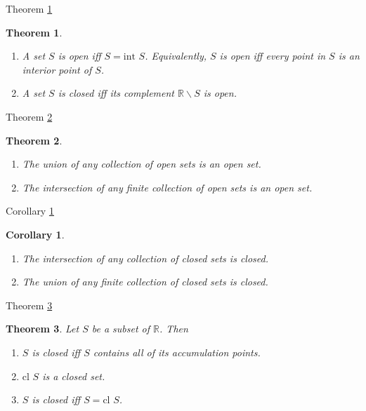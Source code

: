 \documentclass[avery5371,grid]{flashcards}
\newtheorem{corollary}{Corollary}
\newtheorem{theorem}{Theorem}
\newcommand{\bb}[1]{\mathbb{#1}}
\newcommand{\R}{\bb{R}}
\newcommand{\cl}{\mbox{cl }}
\newcommand{\interior}{\mbox{int }}
\begin{document}
\begin{flashcard}[Theorem]{Theorem \ref{thm41}}
\begin{theorem}
\label{thm41} \quad \\
\begin{enumerate}
\item A set $S$ is open iff $S = \interior S$.  Equivalently, $S$ is
open iff every point in $S$ is an interior point of $S$.
\item A set $S$ is closed iff its complement $\R \smallsetminus S$ is
open.
\end{enumerate}
\end{theorem}
\end{flashcard}

\begin{flashcard}[Theorem]{Theorem \ref{thm42}}
\begin{theorem}
\label{thm42} \quad \\
\begin{enumerate}
\item The union of any collection of open sets is an open set.
\item The intersection of any finite collection of open sets is an open
set.
\end{enumerate}
\end{theorem}
\end{flashcard}

\begin{flashcard}[Corollary]{Corollary \ref{cor01}}
\begin{corollary}
\label{cor01} \quad \\
\begin{enumerate}
\item The intersection of any collection of closed sets is closed.
\item The union of any finite collection of closed sets is closed.
\end{enumerate}
\end{corollary}
\end{flashcard}

\begin{flashcard}[Theorem]{Theorem \ref{thm43}}
\begin{theorem}
\label{thm43}
Let $S$ be a subset of $\R$.  Then
\begin{enumerate}
\item $S$ is closed iff $S$ contains all of its accumulation points.
\item $\cl S$ is a closed set.
\item $S$ is closed iff $S = \cl S$.
\end{enumerate}
\end{theorem}
\end{flashcard}
\end{document}

